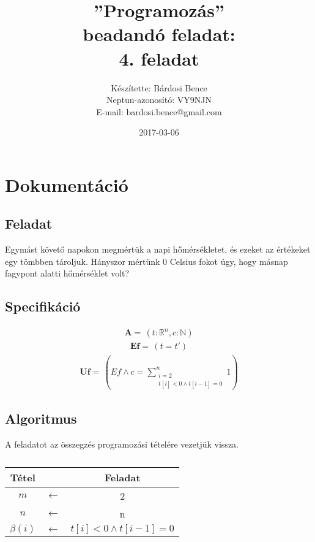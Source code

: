 \documentclass[a4paper]{article}
\title{”Programozás”\\ beadandó feladat:\\ 4. feladat}
\date{2017-03-06}
\author{Készítette: Bárdosi Bence\\ Neptun-azonosító: VY9NJN\\ E-mail: bardosi.bence@gmail.com}
\begin{document}
  \maketitle
  \newpage

  \tableofcontents
  \newpage

  \section{Dokumentáció}
    \subsection{Feladat}
    Egymást követő napokon megmértük a napi hőmérsékletet, és ezeket az értékeket egy
tömbben tároljuk. Hányszor mértünk 0 Celsius fokot úgy, hogy másnap fagypont alatti
hőmérséklet volt?
    \subsection{Specifikáció}
    \begin{align*}
      \mathbf{A=}\, \left ( t: \mathbb{R}^{n} , c: \mathbb{N} \right )
    \end{align*}
    \begin{align*}
      \mathbf{Ef=}\, \left ( t=t' \right )
    \end{align*}
    \begin{align*}
      \mathbf{Uf=}\, \left ( Ef \wedge c=\sum_{\substack{i=2 \\ t[i] < 0 \wedge t[i-1] = 0}}^n 1 \right )
    \end{align*}
    \subsection{Algoritmus}
      A feladatot az összegzés programozási tételére vezetjük vissza.
      \begin{table}[H]
        \caption*{}
        \begin{tabular*}{0.55\textwidth}{ccc}
          \toprule
          Tétel & & Feladat \\
          \midrule
          $m$ & $\leftarrow$ & 2 \\
          $n$ & $\leftarrow$ & n \\
          $\beta (i)$ & $\leftarrow$ & $t[i] < 0 \wedge t[i-1] = 0$ \\
          \bottomrule
        \end{tabular*}
      \end{table}
      
\end{document}

